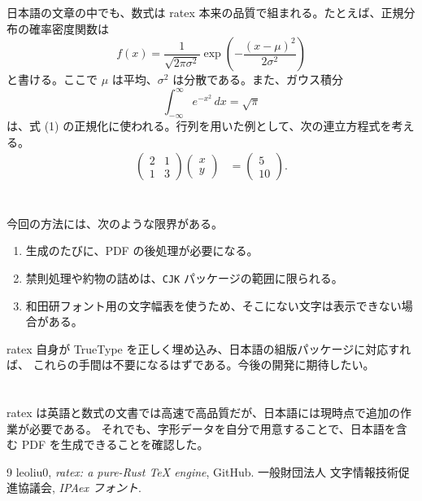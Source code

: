 \section{}
日本語の文章の中でも、数式は ratex 本来の品質で組まれる。たとえば、正規分布の確率密度関数は
\begin{equation}
  f(x) = \frac{1}{\sqrt{2\pi\sigma^2}} \exp\!\left( -\frac{(x-\mu)^2}{2\sigma^2} \right)
\end{equation}
と書ける。ここで $\mu$ は平均、$\sigma^2$ は分散である。また、ガウス積分
\begin{equation}
  \int_{-\infty}^{\infty} e^{-x^2}\,dx = \sqrt{\pi}
\end{equation}
は、式 (1) の正規化に使われる。行列を用いた例として、次の連立方程式を考える。
\begin{align}
  \begin{pmatrix} 2 & 1 \\ 1 & 3 \end{pmatrix}
  \begin{pmatrix} x \\ y \end{pmatrix}
  &=
  \begin{pmatrix} 5 \\ 10 \end{pmatrix}.
\end{align}

\section{}
今回の方法には、次のような限界がある。
\begin{enumerate}
  \item 生成のたびに、PDF の後処理が必要になる。
  \item 禁則処理や約物の詰めは、\texttt{CJK} パッケージの範囲に限られる。
  \item 和田研フォント用の文字幅表を使うため、そこにない文字は表示できない場合がある。
\end{enumerate}
ratex 自身が TrueType を正しく埋め込み、日本語の組版パッケージに対応すれば、
これらの手間は不要になるはずである。今後の開発に期待したい。

\section{}
ratex は英語と数式の文書では高速で高品質だが、日本語には現時点で追加の作業が必要である。
それでも、字形データを自分で用意することで、日本語を含む PDF を生成できることを確認した。

\begin{thebibliography}{9}
 leoliu0, \textit{ratex: a pure-Rust TeX engine}, GitHub.
 一般財団法人 文字情報技術促進協議会, \textit{IPAex フォント}.
\end{thebibliography}
